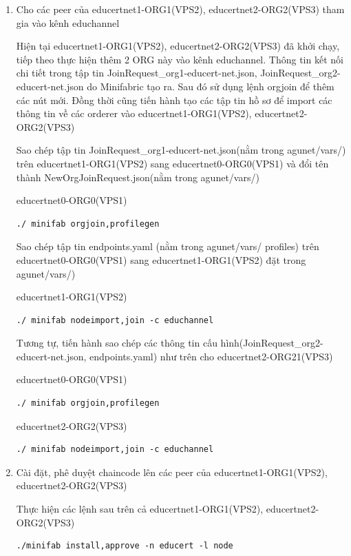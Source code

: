 \begin{enumerate}
    \item Cho các peer của educertnet1-ORG1(VPS2), educertnet2-ORG2(VPS3) tham gia vào kênh educhannel

    Hiện tại educertnet1-ORG1(VPS2), educertnet2-ORG2(VPS3) đã khởi chạy, tiếp theo thực hiện thêm 2 ORG này vào kênh educhannel. Thông tin kết nối chi tiết trong tập tin JoinRequest\_org1-educert-net.json, JoinRequest\_org2-educert-net.json do Minifabric tạo ra. Sau đó sử dụng lệnh orgjoin để thêm các nút mới. Đồng thời cũng tiến hành tạo các tập tin hồ sơ để import các thông tin về các orderer vào educertnet1-ORG1(VPS2), educertnet2-ORG2(VPS3)

    Sao chép tập tin JoinRequest\_org1-educert-net.json(nằm trong agunet/vars/) trên educertnet1-ORG1(VPS2) sang educertnet0-ORG0(VPS1) và đổi tên thành NewOrgJoinRequest.json(nằm trong agunet/vars/)

    educertnet0-ORG0(VPS1)
    \begin{Verbatim}[fontsize=\small]
        ./ minifab orgjoin,profilegen
    \end{Verbatim}
    
    Sao chép tập tin endpoints.yaml (nằm trong agunet/vars/ profiles) trên educertnet0-ORG0(VPS1) sang educertnet1-ORG1(VPS2) đặt trong agunet/vars/)

    educertnet1-ORG1(VPS2)
     \begin{Verbatim}[fontsize=\small]
        ./ minifab nodeimport,join -c educhannel
    \end{Verbatim}

Tương tự, tiến hành sao chép các thông tin cấu hình(JoinRequest\_org2-educert-net.json, endpoints.yaml) như trên cho educertnet2-ORG21(VPS3)

educertnet0-ORG0(VPS1)
     \begin{Verbatim}[fontsize=\small]
        ./ minifab orgjoin,profilegen
    \end{Verbatim}

educertnet2-ORG2(VPS3)
     \begin{Verbatim}[fontsize=\small]
        ./ minifab nodeimport,join -c educhannel
    \end{Verbatim}


    \item Cài đặt, phê duyệt chaincode lên các peer của educertnet1-ORG1(VPS2), educertnet2-ORG2(VPS3)

    Thực hiện các lệnh sau trên cả educertnet1-ORG1(VPS2), educertnet2-ORG2(VPS3)
     \begin{Verbatim}[fontsize=\small]
       ./minifab install,approve -n educert -l node
    \end{Verbatim}


\end{enumerate}
